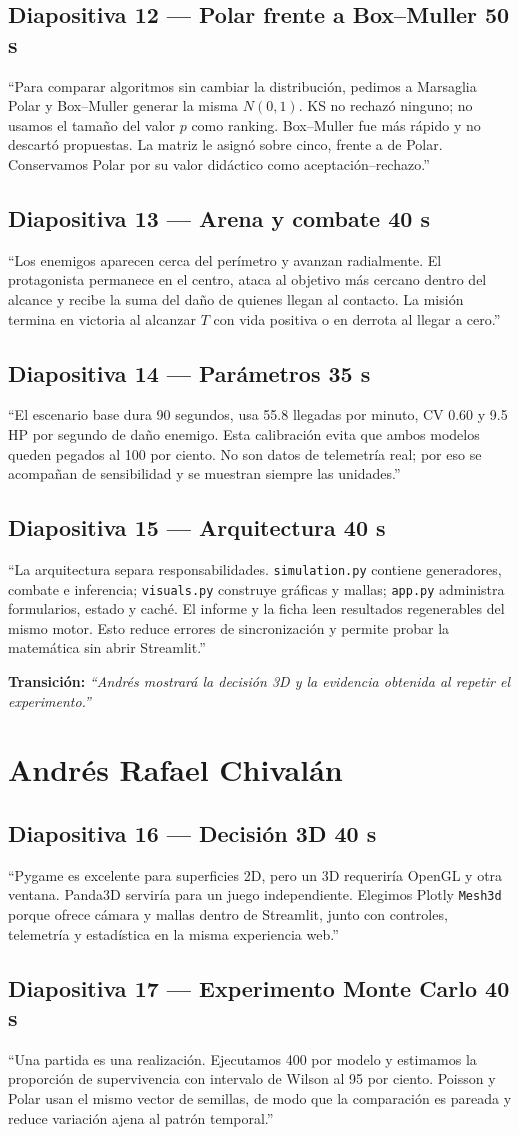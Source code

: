 \documentclass[11pt,a4paper]{article}
\newcommand{\slidecue}[4]{%
  \subsection*{\textcolor{outbreakgreen}{Diapositiva #1 --- #2}\hfill
  \normalfont\small #3}
  \noindent\colorbox{outbreakpale}{\parbox{\dimexpr\textwidth-2\fboxsep}{#4}}
  \vspace{0.45em}}
\newcommand{\handoff}[1]{\vspace{0.4em}\textbf{Transición:} \emph{#1}\par}
\begin{document}
\slidecue{12}{Polar frente a Box--Muller}{50 s}{
``Para comparar algoritmos sin cambiar la distribución, pedimos a Marsaglia
Polar y Box--Muller generar la misma $N(0,1)$. KS no rechazó ninguno; no usamos
el tamaño del valor $p$ como ranking. Box--Muller fue más rápido y no descartó
propuestas. La matriz le asignó \BoxMullerMethodScore{} sobre cinco, frente a
\PolarMethodScore{} de Polar. Conservamos Polar por su valor didáctico como
aceptación--rechazo.''
}

\slidecue{13}{Arena y combate}{40 s}{
``Los enemigos aparecen cerca del perímetro y avanzan radialmente. El
protagonista permanece en el centro, ataca al objetivo más cercano dentro del
alcance y recibe la suma del daño de quienes llegan al contacto. La misión
termina en victoria al alcanzar $T$ con vida positiva o en derrota al llegar a cero.''
}

\slidecue{14}{Parámetros}{35 s}{
``El escenario base dura 90 segundos, usa 55.8 llegadas por minuto, CV 0.60 y
9.5 HP por segundo de daño enemigo. Esta calibración evita que ambos modelos
queden pegados al 100 por ciento. No son datos de telemetría real; por eso se
acompañan de sensibilidad y se muestran siempre las unidades.''
}

\slidecue{15}{Arquitectura}{40 s}{
``La arquitectura separa responsabilidades. \texttt{simulation.py} contiene
generadores, combate e inferencia; \texttt{visuals.py} construye gráficas y
mallas; \texttt{app.py} administra formularios, estado y caché. El informe y
la ficha leen resultados regenerables del mismo motor. Esto reduce errores de
sincronización y permite probar la matemática sin abrir Streamlit.''
}

\handoff{``Andrés mostrará la decisión 3D y la evidencia obtenida al repetir el
experimento.''}

\newpage
\section{Andrés Rafael Chivalán}

\slidecue{16}{Decisión 3D}{40 s}{
``Pygame es excelente para superficies 2D, pero un 3D requeriría OpenGL y otra
ventana. Panda3D serviría para un juego independiente. Elegimos Plotly
\texttt{Mesh3d} porque ofrece cámara y mallas dentro de Streamlit, junto con
controles, telemetría y estadística en la misma experiencia web.''
}

\slidecue{17}{Experimento Monte Carlo}{40 s}{
``Una partida es una realización. Ejecutamos 400 por modelo y estimamos la
proporción de supervivencia con intervalo de Wilson al 95 por ciento. Poisson y
Polar usan el mismo vector de semillas, de modo que la comparación es pareada y
reduce variación ajena al patrón temporal.''
}
\end{document}
